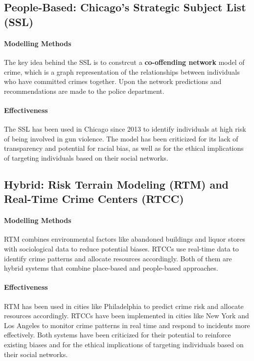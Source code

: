 \documentclass{article}
\begin{document}
\subsection{People-Based: Chicago's Strategic Subject List (SSL)}
\paragraph{Modelling Methods} The key idea behind the SSL is to constrcut a \textbf{co-offending network} model of crime\cite{tayebi2016social,burcher2020social}, which is a graph representation of the relationships between individuals who have committed crimes together. Upon the network predictions and recommendations are made to the police department.

\paragraph{Effectiveness} The SSL has been used in Chicago since 2013 to identify individuals at high risk of being involved in gun violence. The model has been criticized for its lack of transparency and potential for racial bias, as well as for the ethical implications of targeting individuals based on their social networks. 

\subsection{Hybrid: Risk Terrain Modeling (RTM) and Real-Time Crime Centers (RTCC)}
\paragraph{Modelling Methods} RTM\cite{caplan2011risk} combines environmental factors like abandoned buildings and liquor stores with sociological data to reduce potential biases. RTCCs\cite{ratcliffe2011philadelphia} use real-time data to identify crime patterns and allocate resources accordingly. Both of them are hybrid systems that combine place-based and people-based approaches.

\paragraph{Effectiveness} RTM has been used in cities like Philadelphia to predict crime risk and allocate resources accordingly. RTCCs have been implemented in cities like New York and Los Angeles to monitor crime patterns in real time and respond to incidents more effectively. Both systems have been criticized for their potential to reinforce existing biases and for the ethical implications of targeting individuals based on their social networks.
\end{document}
